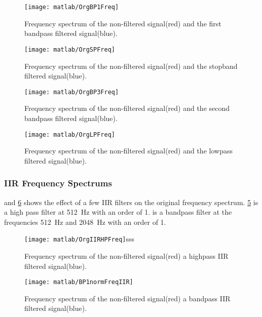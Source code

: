 \begin{figure}[!htb]
	\centering
	\texttt{[image: matlab/OrgBP1Freq]}
	\caption{Frequency spectrum of the non-filtered signal(red) and the first bandpass filtered signal(blue).}
	\label{fig:FIR_bandpass1}
\end{figure}

\begin{figure}[!htb]
	\centering
	\texttt{[image: matlab/OrgSPFreq]}
	\caption{Frequency spectrum of the non-filtered signal(red) and the stopband filtered signal(blue).}
	\label{fig:FIR_stopband}
\end{figure}

\begin{figure}[!htb]
	\centering
	\texttt{[image: matlab/OrgBP3Freq]}
	\caption{Frequency spectrum of the non-filtered signal(red) and the second bandpass filtered signal(blue).}
	\label{fig:FIR_bandpass2}
\end{figure}

\begin{figure}[!htb]
	\centering
	\texttt{[image: matlab/OrgLPFreq]}
	\caption{Frequency spectrum of the non-filtered signal(red) and the lowpass filtered signal(blue).}
	\label{fig:FIR_lowpass}
\end{figure}

\subsubsection{IIR Frequency Spectrums}
 and \cref{fig:IIR_BP1bandpass} shows the effect of a few IIR filters on the original frequency spectrum. \cref{fig:IIR_BP1highpass} is a high pass filter at \SI{512}{\hertz} with an order of 1.  is a bandpass filter at the frequencies \SI{512}{\hertz} and \SI{2048}{\hertz} with an order of 1.

\begin{figure}[!htb]
	\centering
	\texttt{[image: matlab/OrgIIRHPFreq]}sss
	\caption{Frequency spectrum of the non-filtered signal(red) a highpass IIR filtered signal(blue).}
	\label{fig:IIR_BP1highpass}
\end{figure}

\begin{figure}[!htb]
	\centering
	\texttt{[image: matlab/BP1normFreqIIR]}
	\caption{Frequency spectrum of the non-filtered signal(red) a bandpass IIR filtered signal(blue).}
	\label{fig:IIR_BP1bandpass}
\end{figure}

